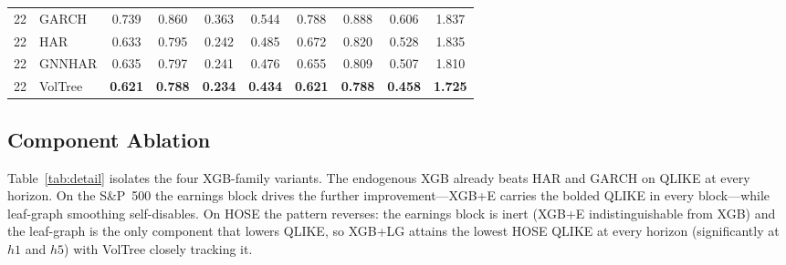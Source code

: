 \documentclass[runningheads,a4paper]{llncs}
\begin{document}
\begin{table}[t]
\begin{tabular}{ll cccc cccc}
\midrule
22 & GARCH    & 0.739 & 0.860 & 0.363 & 0.544 & 0.788 & 0.888 & 0.606 & 1.837 \\
22 & HAR      & 0.633 & 0.795 & 0.242 & 0.485 & 0.672 & 0.820 & 0.528 & 1.835 \\
22 & GNNHAR   & 0.635 & 0.797 & 0.241 & 0.476 & 0.655 & 0.809 & 0.507 & 1.810 \\
22 & VolTree & \textbf{0.621} & \textbf{0.788} & \textbf{0.234} & \textbf{0.434} & \textbf{0.621} & \textbf{0.788} & \textbf{0.458} & \textbf{1.725} \\
\bottomrule
\end{tabular}
\end{table}

\subsection{Component Ablation}
Table~\ref{tab:detail} isolates the four XGB-family variants. The endogenous XGB already beats HAR and
GARCH on QLIKE at every horizon. On the S\&P~500 the earnings block drives the further improvement---XGB+E
carries the bolded QLIKE in every block---while leaf-graph smoothing self-disables. On HOSE the pattern
reverses: the earnings block is inert (XGB+E indistinguishable from XGB) and the leaf-graph is the only
component that lowers QLIKE, so XGB+LG attains the lowest HOSE QLIKE at every horizon (significantly at $h1$
and $h5$) with VolTree closely tracking it.
\end{document}
